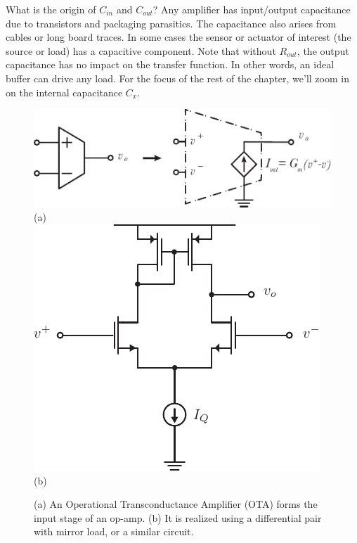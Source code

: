 What is the origin of $C_{in}$ and $C_{out}$?  Any amplifier has input/output capacitance due to transistors and packaging parasitics.  The capacitance also arises from cables or long board traces.  In some cases the sensor or actuator of interest (the source or load) has a capacitive component. Note that without $R_{out}$, the output capacitance has no impact on the transfer function.  In other words, an ideal buffer can drive any load.  For the focus of the rest of the chapter, we'll zoom in on the internal capacitance $C_x$.
\begin{figure}[H]
\centering
\includegraphics[scale=1.35]{OTA}\\
(a)\\[0.5cm]
\includegraphics[width=.55\columnwidth]{Diffpair_se_output.pdf}\\
(b)\\
\caption{(a) An Operational Transconductance Amplifier (OTA) forms the input stage of an op-amp.  (b) It is realized using a differential pair with mirror load, or a similar circuit.}
\label{fig:OTA}
\end{figure}
\newpage

